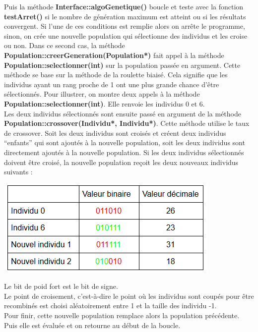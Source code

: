 \documentclass[a4paper,11pt]{article}
\begin{document}
			Puis la méthode \textbf{Interface::algoGenetique()} boucle et teste avec la fonction \textbf{testArret()} si le nombre de génération maximum est atteint ou si les résultats convergent.
			Si l’une de ces conditions est remplie alors on arrête le programme, sinon, on crée une nouvelle population qui sélectionne des individus et les croise ou non.
			Dans ce second cas, la méthode \textbf{Population::creerGeneration(Population*)} fait appel à la méthode \textbf{Population::selectionner(int)} sur la population passée en argument.
			Cette méthode se base sur la méthode de la roulette biaisé.
			Cela signifie que les individus ayant un rang proche de 1 ont une plus grande chance d’être sélectionnés.
			Pour illustrer, on montre deux appels à la méthode \textbf{Population::selectionner(int)}. Elle renvoie les individus 0 et 6.\\

			Les deux individus sélectionnés sont ensuite passé en argument de la méthode \textbf{Population::crossover(Individu*, Individu*)}.
			Cette méthode utilise le taux de crossover.
			Soit les deux individus sont croisés et créent deux individus “enfants” qui sont ajoutés à la nouvelle population, soit les deux individus sont directement ajoutés à la nouvelle population.
			Si les deux individus sélectionnés doivent être croisé, la nouvelle population reçoit les deux nouveaux individus suivants :\\
			\centerline{\includegraphics[scale=0.5]{Crossover.png}}
			Le bit de poid fort est le bit de signe.\\
			Le point de croisement, c’est-à-dire le point où les individus sont coupés pour être recombinés est choisi aléatoirement entre 1 et la taille des individu -1.\\
			
			Pour finir, cette nouvelle population remplace alors la population précédente. Puis elle est évaluée et on retourne au début de la boucle.\\
			
\end{document}
